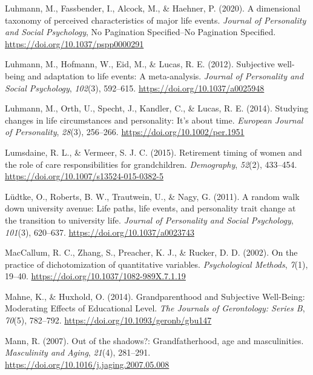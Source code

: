 \documentclass[
  english,
  man, noextraspace]{apa7}
\begin{document}
\leavevmode\hypertarget{ref-luhmannDimensionalTaxonomyPerceived2020}{}%
Luhmann, M., Fassbender, I., Alcock, M., \& Haehner, P. (2020). A dimensional taxonomy of perceived characteristics of major life events. \emph{Journal of Personality and Social Psychology}, No Pagination Specified--No Pagination Specified. \url{https://doi.org/10.1037/pspp0000291}

\leavevmode\hypertarget{ref-luhmannSubjectiveWellbeingAdaptation2012}{}%
Luhmann, M., Hofmann, W., Eid, M., \& Lucas, R. E. (2012). Subjective well-being and adaptation to life events: A meta-analysis. \emph{Journal of Personality and Social Psychology}, \emph{102}(3), 592--615. \url{https://doi.org/10.1037/a0025948}

\leavevmode\hypertarget{ref-luhmannStudyingChangesLife2014}{}%
Luhmann, M., Orth, U., Specht, J., Kandler, C., \& Lucas, R. E. (2014). Studying changes in life circumstances and personality: It's about time. \emph{European Journal of Personality}, \emph{28}(3), 256--266. \url{https://doi.org/10.1002/per.1951}

\leavevmode\hypertarget{ref-lumsdaineRetirementTimingWomen2015}{}%
Lumsdaine, R. L., \& Vermeer, S. J. C. (2015). Retirement timing of women and the role of care responsibilities for grandchildren. \emph{Demography}, \emph{52}(2), 433--454. \url{https://doi.org/10.1007/s13524-015-0382-5}

\leavevmode\hypertarget{ref-ludtkeRandomWalkUniversity2011}{}%
Lüdtke, O., Roberts, B. W., Trautwein, U., \& Nagy, G. (2011). A random walk down university avenue: Life paths, life events, and personality trait change at the transition to university life. \emph{Journal of Personality and Social Psychology}, \emph{101}(3), 620--637. \url{https://doi.org/10.1037/a0023743}

\leavevmode\hypertarget{ref-maccallumPracticeDichotomizationQuantitative2002}{}%
MacCallum, R. C., Zhang, S., Preacher, K. J., \& Rucker, D. D. (2002). On the practice of dichotomization of quantitative variables. \emph{Psychological Methods}, \emph{7}(1), 19--40. \url{https://doi.org/10.1037/1082-989X.7.1.19}

\leavevmode\hypertarget{ref-mahneGrandparenthoodSubjectiveWellBeing2014}{}%
Mahne, K., \& Huxhold, O. (2014). Grandparenthood and Subjective Well-Being: Moderating Effects of Educational Level. \emph{The Journals of Gerontology: Series B}, \emph{70}(5), 782--792. \url{https://doi.org/10.1093/geronb/gbu147}

\leavevmode\hypertarget{ref-mannOutShadowsGrandfatherhood2007}{}%
Mann, R. (2007). Out of the shadows?: Grandfatherhood, age and masculinities. \emph{Masculinity and Aging}, \emph{21}(4), 281--291. \url{https://doi.org/10.1016/j.jaging.2007.05.008}
\end{document}

